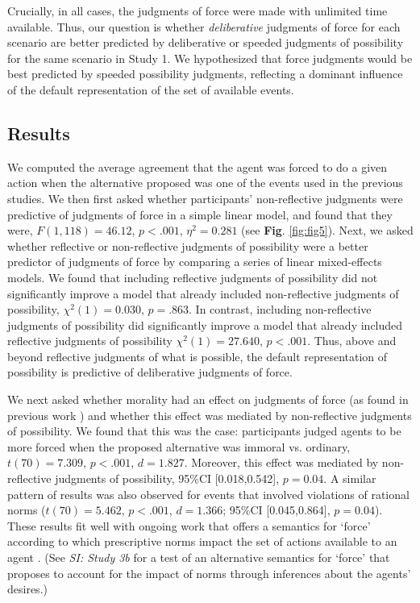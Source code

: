 \documentclass[9pt,twocolumn,twoside]{pnas-new}
\begin{document}
Crucially, in all cases, the judgments of force were made with unlimited time available. Thus, our question is whether \textit{deliberative} judgments of force for each scenario are better predicted by deliberative or speeded judgments of possibility for the same scenario in Study 1.  We hypothesized that force judgments would be best predicted by speeded possibility judgments, reflecting a dominant influence of the default representation of the set of available events.

\subsection*{Results} We computed the average agreement that the agent was forced to do a given action when the alternative proposed was one of the events used in the previous studies. We then first asked whether participants' non-reflective judgments were predictive of judgments of force in a simple linear model, and found that they were, $F(1,118)=46.12$, $p<.001$, $\eta^2=0.281$ (see \textbf{Fig}. \ref{fig:fig5}). Next, we asked whether reflective or non-reflective judgments of possibility were a better predictor of judgments of force by comparing a series of linear mixed-effects models. We found that including reflective judgments of possibility did not significantly improve a model that already included non-reflective judgments of possibility, $\chi^2(1) = 0.030$, $p = .863$. In contrast, including non-reflective judgments of possibility did significantly improve a model that already included reflective judgments of possibility $\chi^2(1) = 27.640$, $p < .001$. Thus, above and beyond reflective judgments of what is possible, the default representation of possibility is predictive of deliberative judgments of force.

We next asked whether morality had an effect on judgments of force (as found in previous work \citep{young2011paradox,phillips2009moral}) and whether this effect was mediated by non-reflective judgments of possibility. We found that this was the case: participants judged agents to be more forced when the proposed alternative was immoral vs. ordinary, $t(70) = 7.309$, $p < .001$, $d = 1.827$. Moreover, this effect was mediated by non-reflective judgments of possibility, 95\%CI [0.018,0.542], $p = 0.04$. A similar pattern of results was also observed for events that involved violations of rational norms ($t(70) = 5.462$, $p < .001$, $d = 1.366$; 95\%CI [0.045,0.864], $p = 0.04$). These results fit well with ongoing work that offers a semantics for `force' according to which prescriptive norms impact the set of actions available to an agent \cite{mandlekern2017force}. (See \textit{SI: Study 3b} for a test of an alternative semantics for `force' that proposes to account for the impact of norms through inferences about the agents' desires.)
\end{document}
